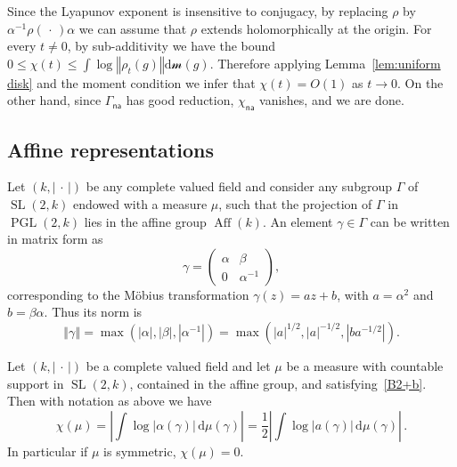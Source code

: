 \documentclass[10pt]{amsart}
\theoremstyle{definition}\newtheorem{defi}[theo]{Definition}\newtheorem{rema}[theo]{Remark}\newtheorem{exam}[theo]{Example}\newtheorem{exem}[theo]{Example}\newtheorem{nota}[theo]{Notation}
\DeclareMathOperator{\SL}{SL}
\DeclareMathOperator{\PGL}{PGL}
\DeclareMathOperator{\Aff}{Aff}
\newcommand{\sm}{\mathcal{m}}
\newcommand{\norm}[1]{\left\Vert#1\right\Vert}
\newcommand{\abs}[1]{\left\vert#1\right\vert}
\newcommand{\lrpar}[1]{\left(#1\right)}
\newcommand{\na}{\mathsf{na}}
\newcommand{\SLk}{\SL(2,k)}
\newcommand{\PGLk}{\PGL(2, k)}
\newcommand{\inv}{^{-1}}
\newcommand*{\dd}{\mathrm{d}}
\newcommand*{\dmu}{\dd \mu}
\newcommand*{\dsm}{\dd \sm}
\begin{document}
Since the Lyapunov exponent is insensitive to conjugacy, by replacing $\rho$ by\linebreak $\alpha\inv\rho({\,\cdot\,})\alpha$ we can assume that $\rho$ extends holomorphically at the origin. For every $t\neq 0$, by sub-additivity we have the bound $0\leq \chi(t) \leq \int \log \norm{\rho_t(g)} \dsm(g)$. Therefore applying Lemma~\ref{lem:uniform disk} and the moment condition we infer that $\chi(t) = O(1)$ as $t\to 0$. On the other hand, since $\Gamma_\na$ has good reduction, $\chi_\na$ vanishes, and we are done.

\subsection{Affine representations}

Let $({k},\abs{{\,\cdot\,}})$ be any complete valued field and consider any subgroup $\Gamma$ of $\SLk$ endowed with a measure $\mu$, such that the projection of $\Gamma$ in $\PGLk$ lies in the affine group $\Aff(k)$. An element $\gamma\in \Gamma$ can be written in matrix form as
\begin{equation}\label{eq:matrix}
\gamma = \lrpar{
\begin{matrix} \alpha & \beta \\ 0 &\alpha\inv
\end{matrix}},
\end{equation}
corresponding to the M\"obius transformation $\gamma(z) = az+b$, with $a= \alpha^2$ and $b = \beta\alpha$. Thus its norm is
\begin{equation}\label{eq:norm affine}
\norm{\gamma} =
\max\lrpar{ \abs{\alpha}, \abs{\beta}, \abs{\alpha\inv} }= \max\lrpar{\abs{a}^{1/2}, \abs{a}^{ -1/2}, \abs{ba^{-1/2}} }.
\end{equation}

\begin{prop}\label{prop:formula affine}
Let $(k,\abs{{\,\cdot\,}})$ be a complete valued field and let $\mu$ be a measure with countable support in $\SLk$, contained in the affine group, and satisfying~\eqref{B2+b}. Then with notation as above we have
\begin{equation}\label{eq:formula affine}
\chi(\mu) =
\abs{\int \log |\alpha (\gamma)| \, \dmu(\gamma)} = \frac12 \abs{\int \log |a(\gamma)|\, \dmu(\gamma)}\,.
\end{equation}
In particular if $\mu$ is symmetric, $\chi(\mu) = 0$.
\end{prop}
\end{document}
